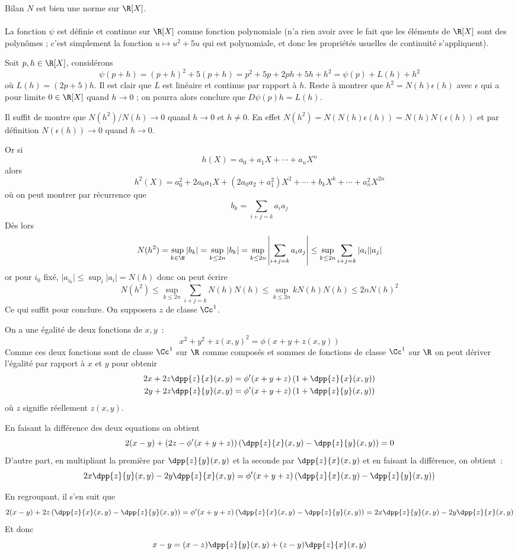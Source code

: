 \documentclass{article}
\begin{document}
Bilan $N$ est bien une norme sur $\R[X]$.

\paragraph{}
La fonction $\psi$ est définie et continue sur $\R[X]$ comme fonction polynomiale (n'a rien avoir avec le fait que les éléments de $\R[X]$ sont des polynômes ; c'est simplement la fonction $u \mapsto u^2 + 5u$ qui est polynomiale, et donc les propriétés usuelles de continuité s'appliquent).

Soit $p,h \in \R[X]$, considérons
\[
\psi(p + h) = (p+h)^2 + 5(p+h) = p^2 + 5p + 2ph + 5h + h^2 = \psi(p) + L(h) + h^2
\]
où $L(h) = (2p+5)h$. Il est clair que $L$ est linéaire et continue par rapport à $h$. Reste à montrer que $h^2 = N(h)\epsilon(h)$ avec $\epsilon$ qui a pour limite $0 \in \R[X]$ quand $h \to 0$ ; on pourra alors conclure que $D\psi(p)h = L(h)$.

Il suffit de montre que $N(h^2)/N(h) \to 0$ quand $h \to 0$ et $h \neq 0$. En effet $N(h^2) = N(N(h)\epsilon(h)) = N(h)N(\epsilon(h))$ et par définition $N(\epsilon(h)) \to 0$ quand $h \to 0$.

Or si \[
h(X) = a_0 + a_1 X + \cdots + a_n X^n
\]
alors
\[
h^2(X) = a_0^2 + 2a_0a_1 X + (2a_0a_2 + a_1^2)X^2 + \cdots + b_k X^k + \cdots + a_n^2 X^{2n}
\]
où on peut montrer par récurrence que 
\[
b_k = \sum_{i+j = k} a_i a_j
\]
Dès lors
\[
N(h^2) =\sup_{k \in \N} \vert b_k \vert = \sup_{k \leq 2n} \vert b_k \vert = \sup_{k \leq 2n}  \left\vert \sum_{i+j = k} a_i a_j\right\vert  \leq \sup_{k \leq 2n}  \sum_{i+j = k} \vert a_i \vert\vert a_j \vert
\]
or pour $i_0$ fixé, $\vert a_{i_0} \vert \leq \sup_i \vert a_i\vert = N(h)$ donc on peut écrire
\[
N(h^2) \leq \sup_{k \leq 2n}  \sum_{i+j = k} N(h)N(h) \leq \sup_{k \leq 2n}  kN(h)N(h) \leq 2n N(h)^2
\]
Ce qui suffit pour conclure.
\exercice{}
On supposera $z$ de classe $\Cc^1$.

On a une égalité de deux fonctions de $x,y$~:
\[
x^2+y^2+z(x,y)^2 = \phi(x + y + z(x,y))
\]
Comme ces deux fonctions sont de classe $\Cc^1$ sur $\R$ comme composés et sommes de fonctions de classe $\Cc^1$ sur $\R$ on peut dériver l'égalité par rapport à $x$ et $y$ pour obtenir
\begin{align*}
2x + 2z\dpp{z}{x}(x,y) &= \phi'(x+y+z)\left(1+ \dpp{z}{x}(x,y)\right)\\
2y + 2z\dpp{z}{y}(x,y) &= \phi'(x+y+z)\left(1+ \dpp{z}{y}(x,y)\right)\\
\end{align*}
où $z$ signifie réellement $z(x,y)$.

En faisant la différence des deux equations on obtient
\[	
2(x-y) + \left(2z - \phi'(x+y+z)\right)\left(\dpp{z}{x}(x,y)-\dpp{z}{y}(x,y)\right) = 0
\]
D'autre part, en multipliant la première par $\dpp{z}{y}(x,y)$ et la seconde par $\dpp{z}{x}(x,y)$ et en faisant la différence, on obtient~:
\[
2x \dpp{z}{y}(x,y) - 2y\dpp{z}{x}(x,y) = \phi'(x+y+z)\left(\dpp{z}{x}(x,y)-\dpp{z}{y}(x,y)\right)
\]

En regroupant, il s'en suit que
\[
2(x-y) + 2z\left(\dpp{z}{x}(x,y)-\dpp{z}{y}(x,y)\right) = \phi'(x+y+z)\left(\dpp{z}{x}(x,y)-\dpp{z}{y}(x,y)\right)
=2x \dpp{z}{y}(x,y) - 2y\dpp{z}{x}(x,y)
\]
Et donc
\[
x- y = (x-z)\dpp{z}{y}(x,y) + (z-y)\dpp{z}{x}(x,y)
\]
\end{document}
